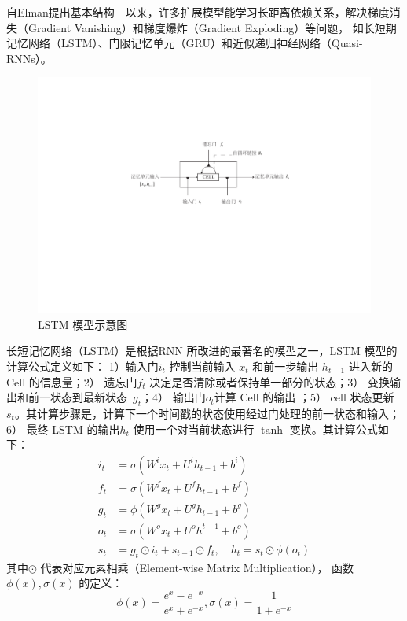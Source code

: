 自Elman提出基本结构~~以来，许多扩展模型能学习长距离依赖关系，解决梯度消失（Gradient Vanishing）和梯度爆炸（Gradient Exploding）等问题， 如长短期记忆网络（LSTM）、门限记忆单元（GRU）和近似递归神经网络（Quasi-RNNs）。

\begin{figure}[!t]
  \centering
  \includegraphics[width=.8\linewidth]{./figures/lstm.pdf}
  \caption{LSTM 模型示意图}\label{fig:lstm}
\end{figure}

长短记忆网络（LSTM）是根据RNN 所改进的最著名的模型之一，LSTM 模型的计算公式定义如下： 1）输入门$i_t$ 控制当前输入 $x_t$ 和前一步输出 $h_{t−1}$ 进入新的 Cell 的信息量；2） 遗忘门$f_t$ 决定是否清除或者保持单一部分的状态；3） 变换输出和前一状态到最新状态~$g_t$；4） 输出门$o_t$计算 Cell 的输出 ；5） cell 状态更新$s_t$。其计算步骤是，计算下一个时间戳的状态使用经过门处理的前一状态和输入；6） 最终 LSTM 的输出$h_t$ 使用一个对当前状态进行 $\tanh$ 变换。其计算公式如下：
\begin{equation}\label{equ:lstm}
\begin{split}
   i_t&=\sigma(W^i x_t+U^i h_{t-1}+b^i) \\
   f_t&=\sigma(W^f x_t+U^f h_{t-1}+b^f) \\
   g_t&=\phi(W^g x_t+U^g h_{t-1}+b^g) \\
   o_t&=\sigma(W^o x_t+U^o h^{t-1}+b^o) \\
   s_t&=g_t\odot i_t+s_{t-1}\odot f_t,\quad h_t=s_t\odot \phi(o_t)
\end{split}
\end{equation}
其中$\odot$ 代表对应元素相乘（Element-wise Matrix Multiplication）， 函数 $\phi(x), \sigma(x)$ 的定义：
\begin{equation}\label{equ:tanh}
  \phi(x)=\frac{e^x-e^{-x}}{e^x+e^{-x}},\sigma(x)=\frac{1}{1+e^{-x}}
\end{equation}

